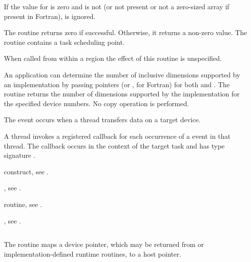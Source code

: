 If the value for  is zero and 
 is not  (or not present or not a
zero-sized array if present in Fortran),  is
ignored.

The routine returns zero if successful.
Otherwise, it returns a non-zero value. The
routine contains a task scheduling point.

When called from within a  region
the effect of this routine is unspecified.

An application can determine the number of
inclusive dimensions supported by an implementation by passing
 pointers (or , for Fortran) for both  and .
The routine returns the number of dimensions supported
by the implementation for the specified device numbers.
No copy operation is performed.

\events
The  event occurs when a thread transfers data on a target device.

\tools
A thread invokes a registered 
callback for each occurrence of a  event in that
thread. The callback occurs in the context of the target task and has
type signature .

\begin{crossrefs}
\item {} construct, see .

\item {}, see .

\item {} routine, see
.

\item {}, see
.

\end{crossrefs}


\subsection{}
\label{subsec:omp_target_associate_ptr}
\summary

The  routine maps a device pointer, which may
be returned from  or implementation-defined runtime
routines, to a host pointer.

